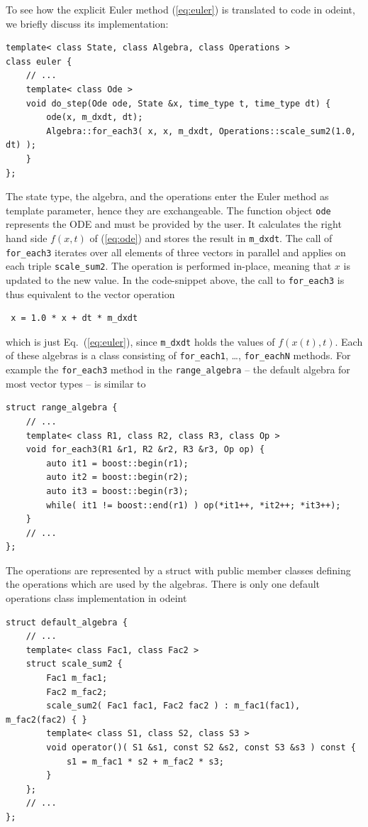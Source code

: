 \documentclass[final]{siamltex}
\newcommand{\code}[1]{\lstinline|#1|}
\newcommand{\eqref}[1]{(\ref{#1})}
\begin{document}
To see how the explicit Euler method \eqref{eq:euler} is translated to
code in odeint, we briefly discuss its implementation:
\begin{lstlisting}
template< class State, class Algebra, class Operations >
class euler {
    // ...
    template< class Ode >
    void do_step(Ode ode, State &x, time_type t, time_type dt) {
        ode(x, m_dxdt, dt);
        Algebra::for_each3( x, x, m_dxdt, Operations::scale_sum2(1.0, dt) );
    }
};
\end{lstlisting}
The state type, the algebra, and the operations enter the Euler method  %
as template parameter, hence they are exchangeable. The function object
\code{ode} represents the ODE and must be provided by the user. It calculates
the right hand side $f(x,t)$ of \eqref{eq:ode} and stores the result in
\code{m_dxdt}. The call of \code{for_each3} iterates over all elements of three vectors in parallel and    %
applies on each triple \code{scale_sum2}. The operation is performed
in-place, meaning that $x$ is updated to the new value.
In the code-snippet above, the call to \code{for_each3} is thus equivalent to the vector operation
\begin{lstlisting}
 x = 1.0 * x + dt * m_dxdt
\end{lstlisting}
which is just Eq.~\eqref{eq:euler}, since \code{m_dxdt} holds the values of $f(x(t), t)$.
Each of these algebras is a class consisting of \code{for_each1},
\dots, \code{for_eachN} methods. For example the \code{for_each3}
method in the \code{range_algebra} -- the default algebra for most vector types -- is similar to
\begin{lstlisting}
struct range_algebra {
    // ...
    template< class R1, class R2, class R3, class Op >
    void for_each3(R1 &r1, R2 &r2, R3 &r3, Op op) {
        auto it1 = boost::begin(r1);
        auto it2 = boost::begin(r2);
        auto it3 = boost::begin(r3);
        while( it1 != boost::end(r1) ) op(*it1++, *it2++; *it3++);
    }
    // ...
};
\end{lstlisting}
The operations are represented by a struct with public member classes defining the
operations which are used by the algebras. There is only one default
operations class implementation in odeint
\begin{lstlisting}
struct default_algebra {
    // ...
    template< class Fac1, class Fac2 >
    struct scale_sum2 {
        Fac1 m_fac1;
        Fac2 m_fac2;
        scale_sum2( Fac1 fac1, Fac2 fac2 ) : m_fac1(fac1), m_fac2(fac2) { }
        template< class S1, class S2, class S3 >
        void operator()( S1 &s1, const S2 &s2, const S3 &s3 ) const {
            s1 = m_fac1 * s2 + m_fac2 * s3;
        }
    };
    // ...
};
\end{lstlisting}
\end{document}
